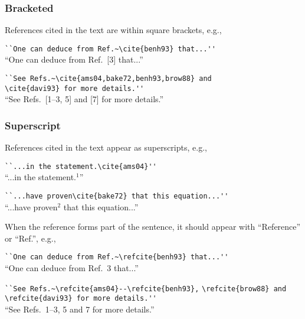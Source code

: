 \subsubsection{Bracketed}
References cited in the text are within square brackets, e.g.,

\begin{arabiclist}[(2)]
\item \verb|``One can deduce from Ref.~\cite{benh93} that...''|\\
            ``One can deduce from Ref.~[3] that...''
\smallskip
\item \verb|``See Refs.~\cite{ams04,bake72,benh93,brow88} and|\\
      \verb|\cite{davi93} for more details.''|\\
      ``See Refs.~[1--3, 5] and [7] for more details.''
\end{arabiclist}

\subsubsection{Superscript}

References cited in the text appear as superscripts, e.g.,

\begin{arabiclist}[(2)]
\item \verb|``...in the statement.\cite{ams04}''|\\
            ``...in the statement.$^1$''
\smallskip
\item \verb|``...have proven\cite{bake72} that this equation...''|\\
            ``...have proven$^2$ that this equation...''
\end{arabiclist}

When the reference forms part of the sentence, it should appear with
``Reference'' or ``Ref.'', e.g.,

\begin{arabiclist}[(2)]
\item \verb|``One can deduce from Ref.~\refcite{benh93} that...''|\\
      ``One can deduce from Ref.~3 that...''
\smallskip
\item \verb|``See Refs.~\refcite{ams04}--\refcite{benh93},|
      \verb|\refcite{brow88} and \refcite{davi93} for more details.''|\\
     ``See Refs.~1--3, 5 and 7 for more details.''
\end{arabiclist}

